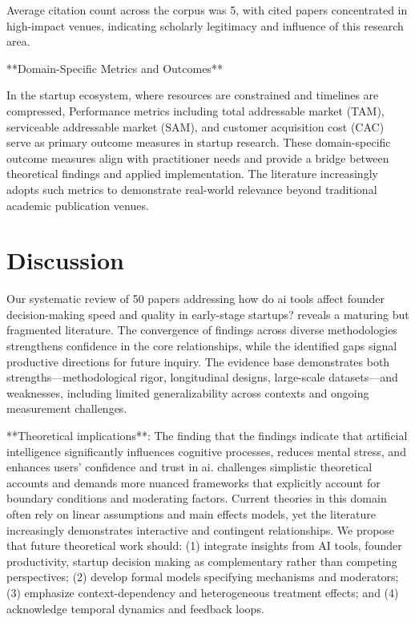 \documentclass[11pt, a4paper]{article}
\begin{document}
Average citation count across the corpus was 5, with cited papers concentrated in high-impact venues, indicating scholarly legitimacy and influence of this research area.

**Domain-Specific Metrics and Outcomes**

In the startup ecosystem, where resources are constrained and timelines are compressed, Performance metrics including total addressable market (TAM), serviceable addressable market (SAM), and customer acquisition cost (CAC) serve as primary outcome measures in startup research. These domain-specific outcome measures align with practitioner needs and provide a bridge between theoretical findings and applied implementation. The literature increasingly adopts such metrics to demonstrate real-world relevance beyond traditional academic publication venues.

\section{Discussion}
Our systematic review of 50 papers addressing how do ai tools affect founder decision-making speed and quality in early-stage startups? reveals a maturing but fragmented literature. The convergence of findings across diverse methodologies strengthens confidence in the core relationships, while the identified gaps signal productive directions for future inquiry. The evidence base demonstrates both strengths—methodological rigor, longitudinal designs, large-scale datasets—and weaknesses, including limited generalizability across contexts and ongoing measurement challenges.

**Theoretical implications**: The finding that the findings indicate that artificial intelligence significantly influences cognitive processes, reduces mental stress, and enhances users’ confidence and trust in ai. challenges simplistic theoretical accounts and demands more nuanced frameworks that explicitly account for boundary conditions and moderating factors. Current theories in this domain often rely on linear assumptions and main effects models, yet the literature increasingly demonstrates interactive and contingent relationships. We propose that future theoretical work should: (1) integrate insights from AI tools, founder productivity, startup decision making as complementary rather than competing perspectives; (2) develop formal models specifying mechanisms and moderators; (3) emphasize context-dependency and heterogeneous treatment effects; and (4) acknowledge temporal dynamics and feedback loops.
\end{document}
